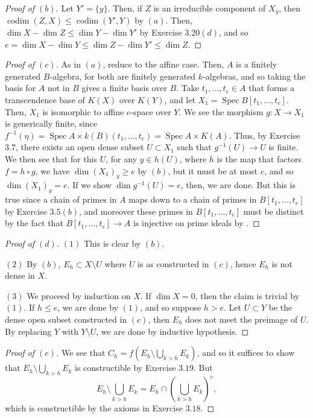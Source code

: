 \documentclass[10pt]{article}
\theoremstyle{definition}
\theoremstyle{remark}
\numberwithin{equation}{section}
\numberwithin{figure}{subsubsection}
\DeclareMathOperator{\Spec}{Spec}
\DeclareMathOperator{\codim}{codim}
\begin{document}
\begin{proof}[Proof of $(b)$]
  Let $Y' = \{y\}$. Then, if $Z$ is an irreducible component of $X_y$, then $\codim(Z,X) \le \codim(Y',Y)$ by $(a)$. Then, $\dim X - \dim Z \le \dim Y - \dim Y'$ by Exercise $3.20(d)$, and so $e = \dim X - \dim Y \le \dim Z - \dim Y' \le \dim Z$.
\end{proof}
\begin{proof}[Proof of $(c)$]
  As in $(a)$, reduce to the affine case. Then, $A$ is a finitely generated
  $B$-algebra, for both are finitely generated $k$-algebras, and so taking the
  basis for $A$ not in $B$ gives a finite basis over $B$. Take $t_1,\ldots,t_e
  \in A$ that forms a transcendence base of $K(X)$ over $K(Y)$, and let $X_1 =
  \Spec B[t_1,\ldots,t_e]$. Then, $X_1$ is isomorphic to affine $e$-space over
  $Y$. We see the morphism $g\colon X \to X_1$ is generically finite, since
  $f^{-1}(\eta) = \Spec A \times k(B)(t_1,\ldots,t_e) = \Spec A \times K(A)$.
  Thus, by Exercise $3.7$, there exists an open dense subset $U \subset X_1$
  such that $g^{-1}(U) \to U$ is finite. We then see that for this $U$, for any
  $y \in h(U)$, where $h$ is the map that factors $f = h \circ g$, we have $\dim
  (X_1)_y \ge e$ by $(b)$, but it must be at most $e$, and so $\dim (X_1)_y =
  e$. If we show $\dim g^{-1}(U) = e$, then, we are done. But this is true since
  a chain of primes in $A$ maps down to a chain of primes in $B[t_1,\ldots,t_e]$
  by Exercise $3.5(b)$, and moreover these primes in $B[t_1,\ldots,t_e]$ must be
  distinct by the fact that $B[t_1,\ldots,t_e] \to A$ is injective on prime
  ideals by \cite[Exc.\ $1.21v$]{AM69}.
\end{proof}
\begin{proof}[Proof of $(d)$]
  $(1)$ This is clear by $(b)$.
  \par $(2)$ By $(b)$, $E_h \subset X \setminus U$ where $U$ is as constructed in $(c)$, hence $E_h$ is not dense in $X$.
  \par $(3)$ We proceed by induction on $X$. If $\dim X = 0$, then the claim is trivial by $(1)$. If $h \le e$, we are done by $(1)$, and so suppose $h > e$. Let $U \subset Y$ be the dense open subset constructed in $(c)$, then $E_h$ does not meet the preimage of $U$. By replacing $Y$ with $Y \setminus U$, we are done by inductive hypothesis.
\end{proof}
\begin{proof}[Proof of $(e)$]
  We see that $C_h = f(E_h \setminus \bigcup_{k > h} E_k)$, and so it suffices to show that $E_h \setminus \bigcup_{k > h} E_k$ is constructible by Exercise $3.19$. But
  \begin{equation*}
    E_h \setminus \bigcup_{k > h} E_k = E_h \cap \left(\bigcup_{k > h} E_k\right)^c,
  \end{equation*}
  which is constructible by the axioms in Exercise $3.18$.
\end{proof}
\end{document}
